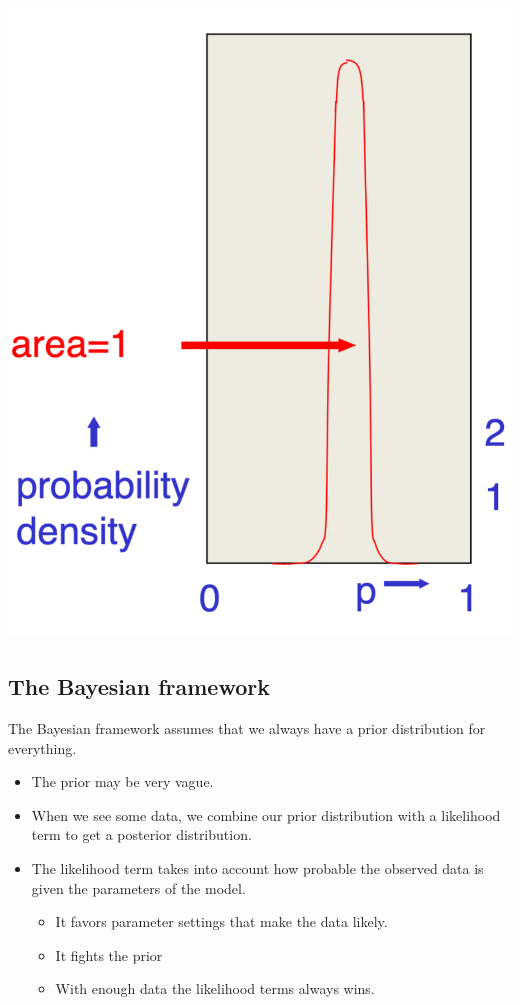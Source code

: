 \documentclass[11pt]{article}
\theoremstyle{definition}
\begin{document}
\includegraphics[width=\textwidth/3]{8.png}

\subsection{The Bayesian framework}

The Bayesian framework assumes that we always have a prior
distribution for everything.

\begin{itemize}
    \item The prior may be very vague.
    \item When we see some data, we combine our prior distribution
    with a likelihood term to get a posterior distribution.
    \item The likelihood term takes into account how probable the
    observed data is given the parameters of the model.
    \begin{itemize}
        \item It favors parameter settings that make the data likely.
        \item It fights the prior
        \item With enough data the likelihood terms always wins.
    \end{itemize}
\end{itemize}
\end{document}
